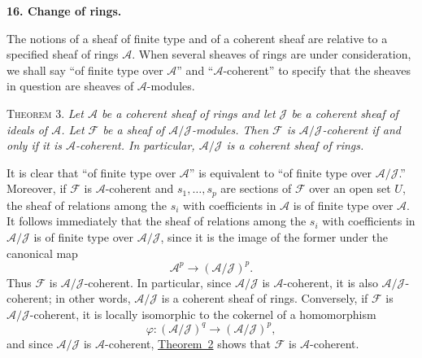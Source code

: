 
\medskip
{}\label{fac:I:2:no:16}
\textbf{16. Change of rings.}

The notions of a sheaf of finite type and of a coherent sheaf are relative to a specified sheaf of rings $\mathcal{A}$. When several sheaves of rings are under consideration, we shall say ``of finite type over $\mathcal{A}$'' and ``$\mathcal{A}$-coherent'' to specify that the sheaves in question are sheaves of $\mathcal{A}$-modules.

\label{fac:I:2:no:16:thm:3}
\textsc{Theorem 3.} \textit{Let $\mathcal{A}$ be a coherent sheaf of rings and let $\mathcal{J}$ be a coherent sheaf of ideals of $\mathcal{A}$. Let $\mathcal{F}$ be a sheaf of $\mathcal{A}/\mathcal{J}$-modules. Then $\mathcal{F}$ is $\mathcal{A}/\mathcal{J}$-coherent if and only if it is $\mathcal{A}$-coherent. In particular, $\mathcal{A}/\mathcal{J}$ is a coherent sheaf of rings.}

It is clear that ``of finite type over $\mathcal{A}$'' is equivalent to ``of finite type over $\mathcal{A}/\mathcal{J}$.'' Moreover, if $\mathcal{F}$ is $\mathcal{A}$-coherent and $s_1,\ldots,s_p$ are sections of $\mathcal{F}$ over an open set $U$, the sheaf of relations among the $s_i$ with coefficients in $\mathcal{A}$ is of finite type over $\mathcal{A}$. It follows immediately that the sheaf of relations among the $s_i$ with coefficients in $\mathcal{A}/\mathcal{J}$ is of finite type over $\mathcal{A}/\mathcal{J}$, since it is the image of the former under the canonical map
\[
\mathcal{A}^p\longrightarrow(\mathcal{A}/\mathcal{J})^p.
\]
Thus $\mathcal{F}$ is $\mathcal{A}/\mathcal{J}$-coherent. In particular, since $\mathcal{A}/\mathcal{J}$ is $\mathcal{A}$-coherent, it is also $\mathcal{A}/\mathcal{J}$-coherent; in other words, $\mathcal{A}/\mathcal{J}$ is a coherent sheaf of rings. Conversely, if $\mathcal{F}$ is $\mathcal{A}/\mathcal{J}$-coherent, it is locally isomorphic to the cokernel of a homomorphism
\[
\varphi:(\mathcal{A}/\mathcal{J})^q\longrightarrow(\mathcal{A}/\mathcal{J})^p,
\]
and since $\mathcal{A}/\mathcal{J}$ is $\mathcal{A}$-coherent, \hyperref[fac:I:2:no:13:thm:2]{Theorem~2} shows that $\mathcal{F}$ is $\mathcal{A}$-coherent.
